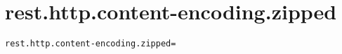 \section{rest.http.content-encoding.zipped}
\label{configuration:RestHttpContentEncodingZipped}
\AvailableInCsharpOnly{\TODO}
\begin{lstlisting}[style=Props,caption={Usage example for \textit{rest.http.content-encoding.zipped}}]
rest.http.content-encoding.zipped=
\end{lstlisting}